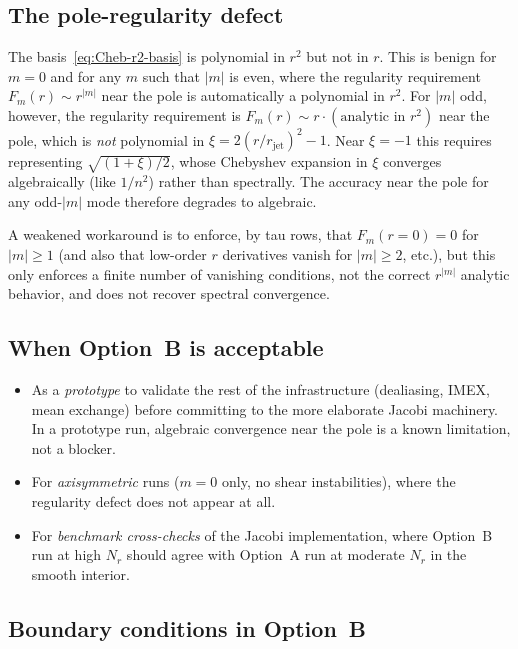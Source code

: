 \documentclass[11pt]{article}
\newcommand{\rjet}{r_{\mathrm{jet}}}
\begin{document}
\subsection{The pole-regularity defect}

The basis~\eqref{eq:Cheb-r2-basis} is polynomial in $r^{2}$ but not
in $r$.  This is benign for $m = 0$ and for any $m$ such that
$|m|$ is even, where the regularity requirement $F_{m}(r) \sim
r^{|m|}$ near the pole is automatically a polynomial in $r^{2}$.
For $|m|$ odd, however, the regularity requirement is
$F_{m}(r) \sim r \cdot (\text{analytic in } r^{2})$ near the pole,
which is \emph{not} polynomial in $\xi = 2(r/\rjet)^{2} - 1$.  Near
$\xi = -1$ this requires representing $\sqrt{(1+\xi)/2}$, whose
Chebyshev expansion in $\xi$ converges algebraically (like $1/n^{2}$)
rather than spectrally.  The accuracy near the pole for any odd-$|m|$
mode therefore degrades to algebraic.

A weakened workaround is to enforce, by tau rows, that
$F_{m}(r=0) = 0$ for $|m| \ge 1$ (and also that low-order $r$
derivatives vanish for $|m| \ge 2$, etc.), but this only enforces a
finite number of vanishing conditions, not the correct $r^{|m|}$
analytic behavior, and does not recover spectral convergence.

\subsection{When Option~B is acceptable}

\begin{itemize}[leftmargin=1.5em]
  \item As a \emph{prototype} to validate the rest of the
  infrastructure (dealiasing, IMEX, mean exchange) before committing
  to the more elaborate Jacobi machinery.  In a prototype run,
  algebraic convergence near the pole is a known limitation, not a
  blocker.
  \item For \emph{axisymmetric} runs ($m = 0$ only, no shear
  instabilities), where the regularity defect does not appear at all.
  \item For \emph{benchmark cross-checks} of the Jacobi
  implementation, where Option~B run at high $N_{r}$ should agree
  with Option~A run at moderate $N_{r}$ in the smooth interior.
\end{itemize}

\subsection{Boundary conditions in Option~B}
\end{document}
